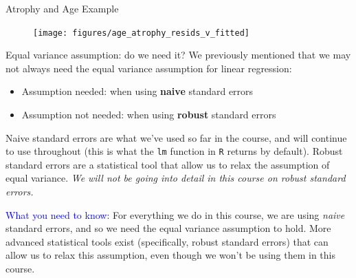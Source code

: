 \documentclass[10pt,t]{beamer}
\begin{document}
\begin{frame}{Atrophy and Age Example}
	\begin{figure}
		\centering
		\texttt{[image: figures/age\_atrophy\_resids\_v\_fitted]}
	\end{figure}
	\medskip
	
\end{frame}


\begin{frame}{Equal variance assumption: do we need it?}
We previously mentioned that we may not always need the equal variance assumption for linear regression:

\vspace{0.3cm}

\begin{itemize}
	\item Assumption needed: when using \textbf{naive} standard errors 
	\item Assumption not needed: when using \textbf{robust} standard errors
\end{itemize}

\vspace{0.3cm}

Naive standard errors are what we've used so far in the course, and will continue to use throughout (this is what the \texttt{lm} function in \texttt{R} returns by default). Robust standard errors are a statistical tool that allow us to relax the assumption of equal variance. \textit{We will not be going into detail in this course on robust standard errors.}

\vspace{0.3cm}

\small \textcolor{blue}{What you need to know:} For everything we do in this course, we are using \textit{naive} standard errors, and so we need the equal variance assumption to hold. More advanced statistical tools exist (specifically, robust standard errors) that can allow us to relax this assumption, even though we won't be using them in this course.

\end{frame}
\end{document}
